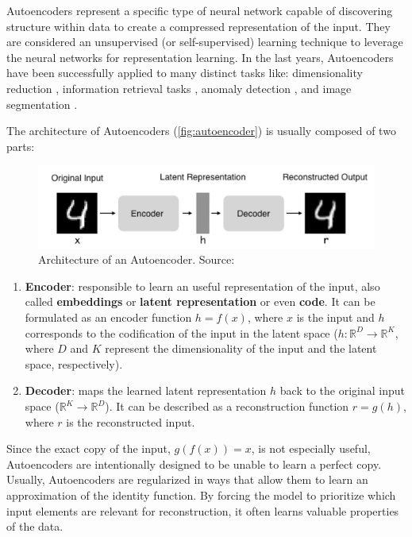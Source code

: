 Autoencoders represent a specific type of neural network capable of discovering structure within data to create a compressed representation of the input. They are considered an unsupervised (or self-supervised) learning technique to leverage the neural networks for representation learning. In the last years, Autoencoders have been successfully applied to many distinct tasks like: dimensionality reduction \citep{petscharnig2017dimensionality, wang2015dimensionality}, information retrieval tasks \citep{pfeiffer2018neural}, anomaly detection \citep{sakurada2014anomaly}, and image segmentation \citep{baur2018deep, karimpouli2019segmentation}.

The architecture of Autoencoders (\autoref{fig:autoencoder}) is usually composed of two parts:

\begin{figure}[tb]
\centering
\includegraphics[width=\linewidth]{images/deep_learning/autoencoder.png}
\caption{Architecture of an Autoencoder. Source: \citep{autoencoder_architecture}}
\label{fig:autoencoder}
\end{figure}

\begin{enumerate}
\item \textbf{Encoder}: responsible to learn an useful representation of the input, also called \textbf{embeddings} or \textbf{latent representation} or even \textbf{code}. It can be formulated as an encoder function $h = f(x)$, where $x$ is the input and $h$ corresponds to the codification of the input in the latent space ($h: \mathbb{R}^D \rightarrow \mathbb{R}^K$, where $D$ and $K$ represent the dimensionality of the input and the latent space, respectively).

\item \textbf{Decoder}: maps the learned latent representation $h$ back to the original input space ($\mathbb{R}^K \rightarrow \mathbb{R}^D$). It can be described as a reconstruction function $r = g(h)$, where $r$ is the reconstructed input.
\end{enumerate}

Since the exact copy of the input, $g(f(x)) = x$, is not especially useful, Autoencoders are intentionally designed to be unable to learn a perfect copy. Usually, Autoencoders are regularized in ways that allow them to learn an approximation of the identity function. By forcing the model to prioritize which input elements are relevant for reconstruction,  it often learns valuable properties of the data.

